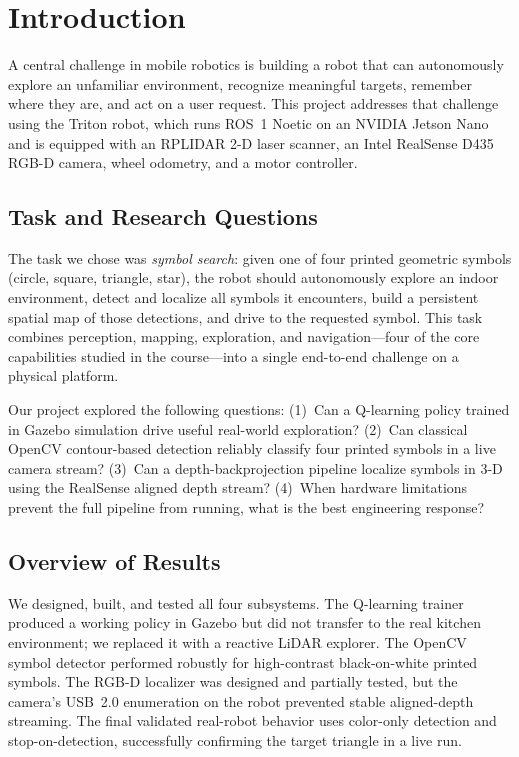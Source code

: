 \documentclass[letterpaper, 10 pt, conference]{ieeeconf/ieeeconf}
\begin{document}
\section{Introduction}

A central challenge in mobile robotics is building a robot that can
autonomously explore an unfamiliar environment, recognize meaningful
targets, remember where they are, and act on a user request.
This project addresses that challenge using the Triton robot, which runs
ROS~1 Noetic on an NVIDIA Jetson Nano and is equipped with an RPLIDAR 2-D
laser scanner, an Intel RealSense D435 RGB-D camera, wheel odometry, and a
motor controller.

\subsection{Task and Research Questions}

The task we chose was \emph{symbol search}: given one of four printed geometric
symbols (circle, square, triangle, star), the robot should autonomously
explore an indoor environment, detect and localize all symbols it encounters,
build a persistent spatial map of those detections, and drive to the
requested symbol.
This task combines perception, mapping, exploration, and navigation---four
of the core capabilities studied in the course---into a single end-to-end
challenge on a physical platform.

Our project explored the following questions:
(1)~Can a Q-learning policy trained in Gazebo simulation drive useful real-world
exploration?
(2)~Can classical OpenCV contour-based detection reliably classify four printed
symbols in a live camera stream?
(3)~Can a depth-backprojection pipeline localize symbols in 3-D using the
RealSense aligned depth stream?
(4)~When hardware limitations prevent the full pipeline from running, what
is the best engineering response?

\subsection{Overview of Results}

We designed, built, and tested all four subsystems.
The Q-learning trainer produced a working policy in Gazebo but did not
transfer to the real kitchen environment; we replaced it with a reactive
LiDAR explorer.
The OpenCV symbol detector performed robustly for high-contrast black-on-white
printed symbols.
The RGB-D localizer was designed and partially tested, but the camera's
USB~2.0 enumeration on the robot prevented stable aligned-depth streaming.
The final validated real-robot behavior uses color-only detection and
stop-on-detection, successfully confirming the target triangle in a live run.
\end{document}

